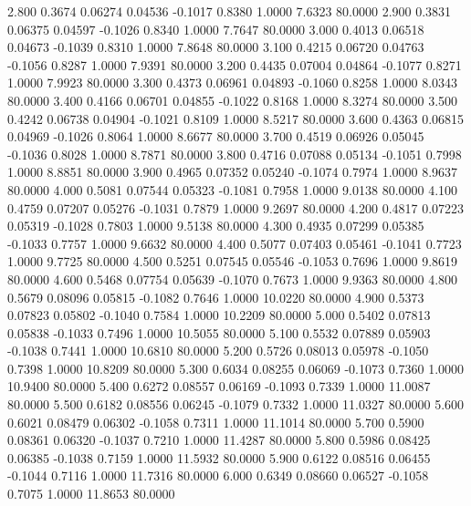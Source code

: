    2.800   0.3674   0.06274   0.04536  -0.1017   0.8380   1.0000   7.6323  80.0000
   2.900   0.3831   0.06375   0.04597  -0.1026   0.8340   1.0000   7.7647  80.0000
   3.000   0.4013   0.06518   0.04673  -0.1039   0.8310   1.0000   7.8648  80.0000
   3.100   0.4215   0.06720   0.04763  -0.1056   0.8287   1.0000   7.9391  80.0000
   3.200   0.4435   0.07004   0.04864  -0.1077   0.8271   1.0000   7.9923  80.0000
   3.300   0.4373   0.06961   0.04893  -0.1060   0.8258   1.0000   8.0343  80.0000
   3.400   0.4166   0.06701   0.04855  -0.1022   0.8168   1.0000   8.3274  80.0000
   3.500   0.4242   0.06738   0.04904  -0.1021   0.8109   1.0000   8.5217  80.0000
   3.600   0.4363   0.06815   0.04969  -0.1026   0.8064   1.0000   8.6677  80.0000
   3.700   0.4519   0.06926   0.05045  -0.1036   0.8028   1.0000   8.7871  80.0000
   3.800   0.4716   0.07088   0.05134  -0.1051   0.7998   1.0000   8.8851  80.0000
   3.900   0.4965   0.07352   0.05240  -0.1074   0.7974   1.0000   8.9637  80.0000
   4.000   0.5081   0.07544   0.05323  -0.1081   0.7958   1.0000   9.0138  80.0000
   4.100   0.4759   0.07207   0.05276  -0.1031   0.7879   1.0000   9.2697  80.0000
   4.200   0.4817   0.07223   0.05319  -0.1028   0.7803   1.0000   9.5138  80.0000
   4.300   0.4935   0.07299   0.05385  -0.1033   0.7757   1.0000   9.6632  80.0000
   4.400   0.5077   0.07403   0.05461  -0.1041   0.7723   1.0000   9.7725  80.0000
   4.500   0.5251   0.07545   0.05546  -0.1053   0.7696   1.0000   9.8619  80.0000
   4.600   0.5468   0.07754   0.05639  -0.1070   0.7673   1.0000   9.9363  80.0000
   4.800   0.5679   0.08096   0.05815  -0.1082   0.7646   1.0000  10.0220  80.0000
   4.900   0.5373   0.07823   0.05802  -0.1040   0.7584   1.0000  10.2209  80.0000
   5.000   0.5402   0.07813   0.05838  -0.1033   0.7496   1.0000  10.5055  80.0000
   5.100   0.5532   0.07889   0.05903  -0.1038   0.7441   1.0000  10.6810  80.0000
   5.200   0.5726   0.08013   0.05978  -0.1050   0.7398   1.0000  10.8209  80.0000
   5.300   0.6034   0.08255   0.06069  -0.1073   0.7360   1.0000  10.9400  80.0000
   5.400   0.6272   0.08557   0.06169  -0.1093   0.7339   1.0000  11.0087  80.0000
   5.500   0.6182   0.08556   0.06245  -0.1079   0.7332   1.0000  11.0327  80.0000
   5.600   0.6021   0.08479   0.06302  -0.1058   0.7311   1.0000  11.1014  80.0000
   5.700   0.5900   0.08361   0.06320  -0.1037   0.7210   1.0000  11.4287  80.0000
   5.800   0.5986   0.08425   0.06385  -0.1038   0.7159   1.0000  11.5932  80.0000
   5.900   0.6122   0.08516   0.06455  -0.1044   0.7116   1.0000  11.7316  80.0000
   6.000   0.6349   0.08660   0.06527  -0.1058   0.7075   1.0000  11.8653  80.0000
